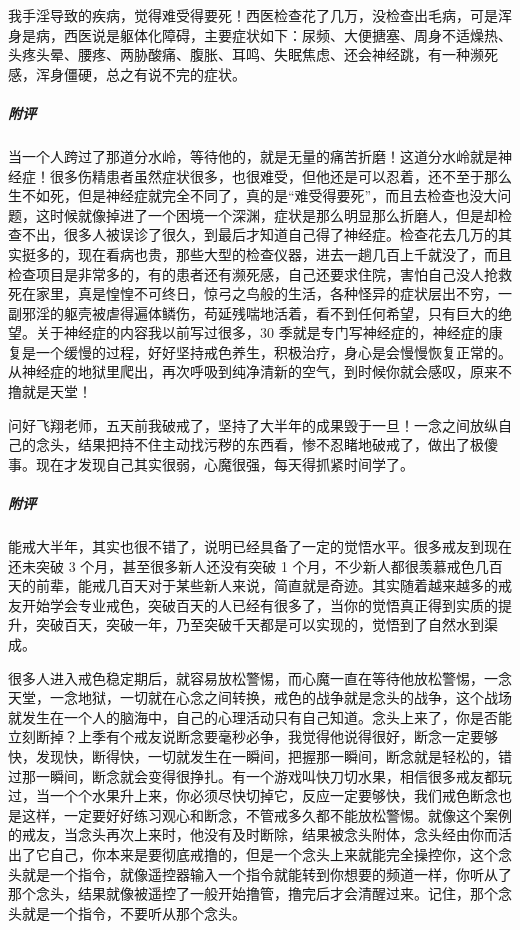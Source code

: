 \begin{case}
    我手淫导致的疾病，觉得难受得要死！西医检查花了几万，没检查出毛病，可是浑身是病，西医说是躯体化障碍，主要症状如下：尿频、大便搪塞、周身不适燥热、头疼头晕、腰疼、两胁酸痛、腹胀、耳鸣、失眠焦虑、还会神经跳，有一种濒死感，浑身僵硬，总之有说不完的症状。
    \subparagraph{附评} 当一个人跨过了那道分水岭，等待他的，就是无量的痛苦折磨！这道分水岭就是神经症！很多伤精患者虽然症状很多，也很难受，但他还是可以忍着，还不至于那么生不如死，但是神经症就完全不同了，真的是“难受得要死”，而且去检查也没大问题，这时候就像掉进了一个困境一个深渊，症状是那么明显那么折磨人，但是却检查不出，很多人被误诊了很久，到最后才知道自己得了神经症。检查花去几万的其实挺多的，现在看病也贵，那些大型的检查仪器，进去一趟几百上千就没了，而且检查项目是非常多的，有的患者还有濒死感，自己还要求住院，害怕自己没人抢救死在家里，真是惶惶不可终日，惊弓之鸟般的生活，各种怪异的症状层出不穷，一副邪淫的躯壳被虐得遍体鳞伤，苟延残喘地活着，看不到任何希望，只有巨大的绝望。关于神经症的内容我以前写过很多，30 季就是专门写神经症的，神经症的康复是一个缓慢的过程，好好坚持戒色养生，积极治疗，身心是会慢慢恢复正常的。从神经症的地狱里爬出，再次呼吸到纯净清新的空气，到时候你就会感叹，原来不撸就是天堂！
\end{case}

\begin{case}
    问好飞翔老师，五天前我破戒了，坚持了大半年的成果毁于一旦！一念之间放纵自己的念头，结果把持不住主动找污秽的东西看，惨不忍睹地破戒了，做出了极傻事。现在才发现自己其实很弱，心魔很强，每天得抓紧时间学了。
    \subparagraph{附评}
    能戒大半年，其实也很不错了，说明已经具备了一定的觉悟水平。很多戒友到现在还未突破 3 个月，甚至很多新人还没有突破 1 个月，不少新人都很羡慕戒色几百天的前辈，能戒几百天对于某些新人来说，简直就是奇迹。其实随着越来越多的戒友开始学会专业戒色，突破百天的人已经有很多了，当你的觉悟真正得到实质的提升，突破百天，突破一年，乃至突破千天都是可以实现的，觉悟到了自然水到渠成。

    很多人进入戒色稳定期后，就容易放松警惕，而心魔一直在等待他放松警惕，一念天堂，一念地狱，一切就在心念之间转换，戒色的战争就是念头的战争，这个战场就发生在一个人的脑海中，自己的心理活动只有自己知道。念头上来了，你是否能立刻断掉？上季有个戒友说断念要毫秒必争，我觉得他说得很好，断念一定要够快，发现快，断得快，一切就发生在一瞬间，把握那一瞬间，断念就是轻松的，错过那一瞬间，断念就会变得很挣扎。有一个游戏叫快刀切水果，相信很多戒友都玩过，当一个个水果升上来，你必须尽快切掉它，反应一定要够快，我们戒色断念也是这样，一定要好好练习观心和断念，不管戒多久都不能放松警惕。就像这个案例的戒友，当念头再次上来时，他没有及时断除，结果被念头附体，念头经由你而活出了它自己，你本来是要彻底戒撸的，但是一个念头上来就能完全操控你，这个念头就是一个指令，就像遥控器输入一个指令就能转到你想要的频道一样，你听从了那个念头，结果就像被遥控了一般开始撸管，撸完后才会清醒过来。记住，那个念头就是一个指令，不要听从那个念头。
\end{case}

